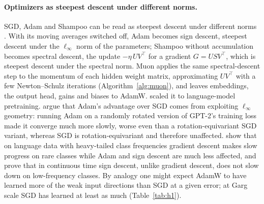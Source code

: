 \paragraph{Optimizers as steepest descent under different norms.} SGD, Adam and Shampoo \citep{gupta2018shampoo} can be read as steepest descent under different norms \citep{bernstein2024old}. With its moving averages switched off, Adam becomes sign descent, steepest descent under the $\ell_\infty$ norm of the parameters; Shampoo without accumulation becomes spectral descent, the update $-\eta\,UV^\top$ for a gradient $G = USV^\top$, which is steepest descent under the spectral norm. Muon \citep{jordan2024muon} applies the same spectral-descent step to the momentum of each hidden weight matrix, approximating $UV^\top$ with a few Newton--Schulz iterations (Algorithm~\ref{alg:muon}), and leaves embeddings, the output head, gains and biases to AdamW. \citet{liu2025muon} scaled it to language-model pretraining. \citet{xie2025adam} argue that Adam's advantage over SGD comes from exploiting $\ell_\infty$ geometry: running Adam on a randomly rotated version of GPT-2's training loss made it converge much more slowly, worse even than a rotation-equivariant SGD variant, whereas SGD is rotation-equivariant and therefore unaffected. \citet{kunstner2024heavy} show that on language data with heavy-tailed class frequencies gradient descent makes slow progress on rare classes while Adam and sign descent are much less affected, and prove that in continuous time sign descent, unlike gradient descent, does not slow down on low-frequency classes. By analogy one might expect AdamW to have learned more of the weak input directions than SGD at a given error; at Garg scale SGD has learned at least as much (Table~\ref{tab:h1}).

